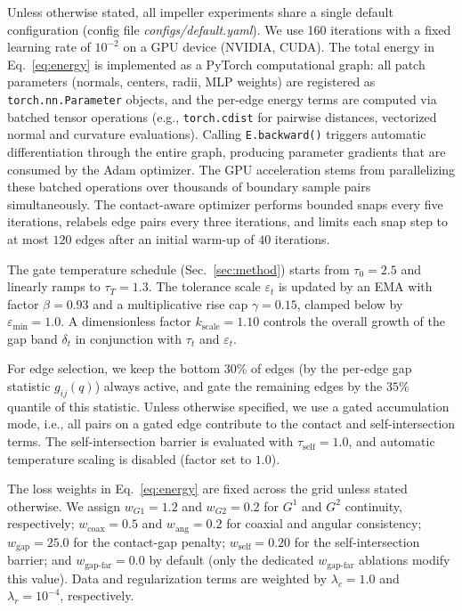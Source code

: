 \documentclass{ieeeaccess}
\begin{document}
Unless otherwise stated, all impeller experiments share a single default
configuration (config file \emph{configs/default.yaml}).
We use 160 iterations with a fixed learning rate of $10^{-2}$ on a GPU
device (NVIDIA, CUDA).
The total energy in Eq.~\eqref{eq:energy} is implemented as a PyTorch
computational graph: all patch parameters (normals, centers, radii,
MLP weights) are registered as \texttt{torch.nn.Parameter} objects, and
the per-edge energy terms are computed via batched tensor operations
(e.g., \texttt{torch.cdist} for pairwise distances, vectorized normal
and curvature evaluations).
Calling \texttt{E.backward()} triggers automatic differentiation through
the entire graph, producing parameter gradients that are consumed by
the Adam optimizer.
The GPU acceleration stems from parallelizing these batched operations
over thousands of boundary sample pairs simultaneously.
The contact-aware optimizer performs bounded snaps every
five iterations, relabels edge pairs every three iterations, and limits each
snap step to at most $120$ edges after an initial warm-up of
$40$ iterations.

The gate temperature schedule (Sec.~\ref{sec:method}) starts from
$\tau_0 = 2.5$ and linearly ramps to
$\tau_T = 1.3$. The tolerance scale
$\varepsilon_t$ is updated by an EMA with factor
$\beta = 0.93$ and a multiplicative rise cap
$\gamma = 0.15$, clamped below by
$\varepsilon_{\min} = 1.0$. A dimensionless factor
$k_{\mathrm{scale}} = 1.10$ controls the overall growth of the gap band
$\delta_t$ in conjunction with $\tau_t$ and $\varepsilon_t$.

For edge selection, we keep the bottom $30\%$ of edges (by the per-edge gap statistic
$g_{ij}(q)$) always active, and gate the remaining edges by the $35\%$ quantile of this statistic.
Unless otherwise specified, we use a gated accumulation mode, i.e., all pairs on a gated edge
contribute to the contact and self-intersection terms.
The self-intersection barrier is evaluated with
$\tau_{\mathrm{self}} = 1.0$, and automatic temperature scaling is disabled
(factor set to $1.0$).

The loss weights in Eq.~\eqref{eq:energy} are fixed across the grid unless
stated otherwise. We assign $w_{G1} = 1.2$ and
$w_{G2} = 0.2$ for $G^1$ and $G^2$ continuity, respectively;
$w_{\text{coax}} = 0.5$ and
$w_{\text{ang}} = 0.2$ for coaxial and angular consistency;
$w_{\text{gap}} = 25.0$ for the contact-gap penalty;
$w_{\text{self}} = 0.20$ for the self-intersection
barrier; and $w_{\text{gap-far}} = 0.0$ by default
(only the dedicated $w_{\text{gap-far}}$ ablations modify this value).
Data and regularization terms are weighted by
$\lambda_c = 1.0$ and
$\lambda_r = 10^{-4}$, respectively.
\end{document}
